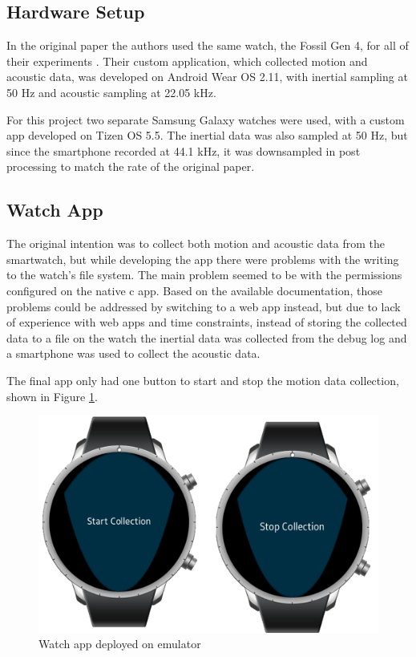 \documentclass[conference]{IEEEtran}
\begin{document}
	\subsection{Hardware Setup}
	In the original paper the authors used the same watch, the Fossil Gen 4, for all of their experiments \cite{2022_Leveraging_sound}.
	Their custom application, which collected motion and acoustic data, was developed on Android Wear OS 2.11, with inertial sampling at 50 Hz and acoustic sampling at 22.05 kHz.
	
	For this project two separate Samsung Galaxy watches were used, with a custom app developed on Tizen OS 5.5.
	The inertial data was also sampled at 50 Hz, but since the smartphone recorded at 44.1 kHz, it was downsampled in post processing to match the rate of the original paper.
	
	\subsection{Watch App}
	The original intention was to collect both motion and acoustic data from the smartwatch, but while developing the app there were problems with the writing to the watch's file system.
	The main problem seemed to be with the permissions configured on the native c app.
	Based on the available documentation, those problems could be addressed by switching to a web app instead, but due to lack of experience with web apps and time constraints, instead of storing the collected data to a file on the watch the inertial data was collected from the debug log and a smartphone was used to collect the acoustic data.
	
	The final app only had one button to start and stop the motion data collection, shown in Figure \ref{fig: watch_app_picture}.
	
	\begin{figure}[h]
		\centering
		\includegraphics[scale=0.75]{watch_app_picture}
		\caption{Watch app deployed on emulator}
		\label{fig: watch_app_picture}
	\end{figure}
	
\end{document}
